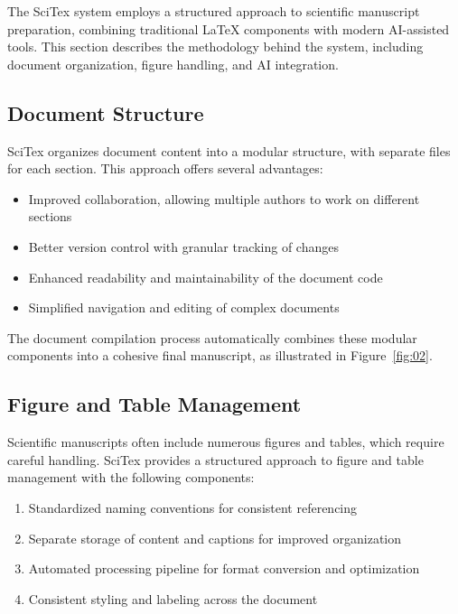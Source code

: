
The SciTex system employs a structured approach to scientific manuscript preparation, combining traditional LaTeX components with modern AI-assisted tools. This section describes the methodology behind the system, including document organization, figure handling, and AI integration.

\subsection{Document Structure}

SciTex organizes document content into a modular structure, with separate files for each section. This approach offers several advantages:

\begin{itemize}
    \item Improved collaboration, allowing multiple authors to work on different sections
    \item Better version control with granular tracking of changes
    \item Enhanced readability and maintainability of the document code
    \item Simplified navigation and editing of complex documents
\end{itemize}

The document compilation process automatically combines these modular components into a cohesive final manuscript, as illustrated in Figure~\ref{fig:02}.

\subsection{Figure and Table Management}
\label{sec:figure_management}

Scientific manuscripts often include numerous figures and tables, which require careful handling. SciTex provides a structured approach to figure and table management with the following components:

\begin{enumerate}
    \item Standardized naming conventions for consistent referencing
    \item Separate storage of content and captions for improved organization
    \item Automated processing pipeline for format conversion and optimization
    \item Consistent styling and labeling across the document
\end{enumerate}

